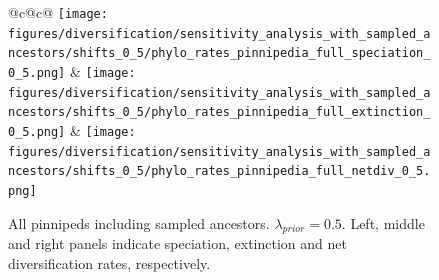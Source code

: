 \documentclass[a4paper, 12pt]{article}
\begin{document}
\begin{figure}[H]
  \centering
  \begin{tabular}{@{}c@{\hspace{.5cm}}c@{}}
  \texttt{[image: figures/diversification/sensitivity\_analysis\_with\_sampled\_ancestors/shifts\_0\_5/phylo\_rates\_pinnipedia\_full\_speciation\_0\_5.png]} &
  \texttt{[image: figures/diversification/sensitivity\_analysis\_with\_sampled\_ancestors/shifts\_0\_5/phylo\_rates\_pinnipedia\_full\_extinction\_0\_5.png]} &
  \texttt{[image: figures/diversification/sensitivity\_analysis\_with\_sampled\_ancestors/shifts\_0\_5/phylo\_rates\_pinnipedia\_full\_netdiv\_0\_5.png]} \\
  \end{tabular}
  \caption{All pinnipeds including sampled ancestors. $\lambda_{prior} = 0.5$. Left, middle and right panels indicate speciation, extinction and net diversification rates, respectively.}
  \label{fig-full-0-5}
\end{figure}

\end{document}
